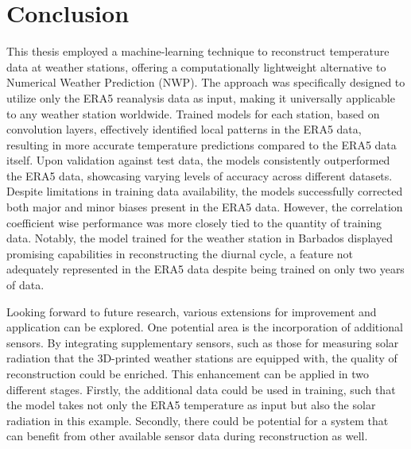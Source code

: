 \section{Conclusion}
\label{sec: conclusion}

This thesis employed a machine-learning technique to reconstruct temperature data at weather stations, offering a computationally lightweight alternative to Numerical Weather Prediction (NWP).
The approach was specifically designed to utilize only the ERA5 reanalysis data as input, making it universally applicable to any weather station worldwide.
Trained models for each station, based on convolution layers, effectively identified local patterns in the ERA5 data, resulting in more accurate temperature predictions compared to the ERA5 data itself.
Upon validation against test data, the models consistently outperformed the ERA5 data, showcasing varying levels of accuracy across different datasets.
Despite limitations in training data availability, the models successfully corrected both major and minor biases present in the ERA5 data. However, the correlation coefficient wise performance was more closely tied to the quantity of training data.
Notably, the model trained for the weather station in Barbados displayed promising capabilities in reconstructing the diurnal cycle, a feature not adequately represented in the ERA5 data despite being trained on only two years of data.

Looking forward to future research, various extensions for improvement and application can be explored.
One potential area is the incorporation of additional sensors.
By integrating supplementary sensors, such as those for measuring solar radiation that the 3D-printed weather stations are equipped with, the quality of reconstruction could be enriched.
This enhancement can be applied in two different stages.
Firstly, the additional data could be used in training, such that the model takes not only the ERA5 temperature as input but also the solar radiation in this example.
Secondly, there could be potential for a system that can benefit from other available sensor data during reconstruction as well. 

